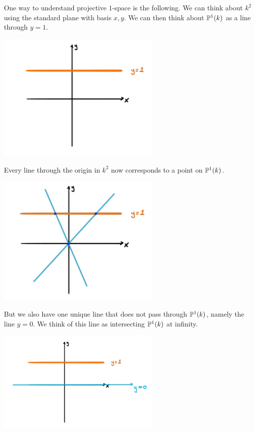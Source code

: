 \iffalse
\begin{solution}

One way to understand projective $1$-space is the following. We can think about $k^2$ using the standard plane with basis $x, y$. We can then think about $\P^1(k)$ as a line through $y=1$. 

\begin{center}
\includegraphics[width=8cm]{img/lecture_5/projective2.png}
\end{center}

Every line through the origin in $k^2$ now corresponds to a point on $\P^1(k)$. 

\begin{center}
\includegraphics[width=8cm]{img/lecture_5/projective3.png}
\end{center}

But we also have one unique line that does not pass through $\P^1(k)$, namely the line $y=0$. We think of this line as intersecting $\P^1(k)$ at infinity. 

\begin{center}
\includegraphics[width=8cm]{img/lecture_5/projective4.png}
\end{center}


\end{solution}
